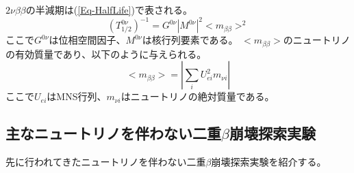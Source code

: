 \documentclass[a4paper,10pt]{jreport}
\begin{document}
$2\nu\beta\beta$の半減期は(\ref{Eq-HalfLife})で表される。
\begin{equation} \label{Eq-HalfLife}
	\left(T_{1/2}^{0\nu}\right)^{-1} = G^{0\nu}|M^{0\nu}|^2<m_{\beta\beta}>^2
\end{equation}
ここで$G^{0\nu}$は位相空間因子、$M^{0\nu}$は核行列要素である。
$<m_{\beta\beta}>$のニュートリノの有効質量であり、以下のように与えられる。
\begin{equation} \label{Eq-EffectiveMass}
	< m_{\beta\beta} > =|\sum_i U_{ei}^2m_{\nu i}|
\end{equation}
ここで$U_{ei}$はMNS行列、$m_{\nu i}$はニュートリノの絶対質量である。



\subsection{主なニュートリノを伴わない二重$\beta$崩壊探索実験}

先に行われてきたニュートリノを伴わない二重$\beta$崩壊探索実験を紹介する。
\end{document}
